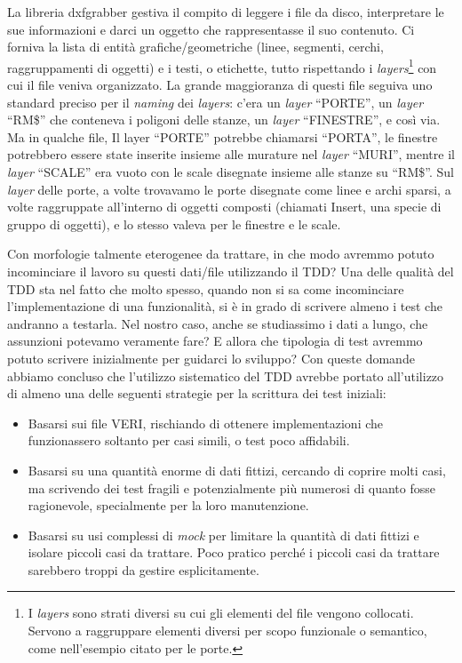 \documentclass[12pt]{report}
\begin{document}
La libreria dxfgrabber gestiva il compito di leggere i file da disco, interpretare le sue informazioni e darci un oggetto che rappresentasse il suo contenuto. Ci forniva la lista di entità grafiche/geometriche (linee, segmenti, cerchi, raggruppamenti di oggetti) e i testi, o etichette, tutto rispettando i 
\textit{layers}\footnote{I \textit{layers} sono strati diversi su cui gli elementi del file vengono collocati. Servono a raggruppare elementi diversi per scopo funzionale o semantico, come nell'esempio citato per le porte.}
con cui il file veniva organizzato. La grande maggioranza di questi file seguiva uno standard preciso per il \textit{naming} dei \textit{layers}: c'era un \textit{layer} ``PORTE'', un \textit{layer} ``RM\$'' che conteneva i poligoni delle stanze, un \textit{layer} ``FINESTRE'', e così via. Ma in qualche file, Il layer ``PORTE'' potrebbe chiamarsi ``PORTA'', le finestre potrebbero essere state inserite insieme alle murature nel \textit{layer} ``MURI'', mentre il \textit{layer} ``SCALE'' era vuoto con le scale disegnate insieme alle stanze su ``RM\$''. Sul \textit{layer} delle porte, a volte trovavamo le porte disegnate come linee e archi sparsi, a volte raggruppate all'interno di oggetti composti (chiamati Insert, una specie di gruppo di oggetti), e lo stesso valeva per le finestre e le scale. 

Con morfologie talmente eterogenee da trattare, in che modo avremmo potuto incominciare il lavoro su questi dati/file utilizzando il TDD? Una delle qualità del TDD sta nel fatto che molto spesso, quando non si sa come incominciare l'implementazione di una funzionalità, si è in grado di scrivere almeno i test che andranno a testarla. Nel nostro caso, anche se studiassimo i dati a lungo, che assunzioni potevamo veramente fare? E allora che tipologia di test avremmo potuto scrivere inizialmente per guidarci lo sviluppo? Con queste domande abbiamo concluso che l'utilizzo sistematico del TDD avrebbe portato all'utilizzo di almeno una delle seguenti strategie per la scrittura dei test iniziali:

\begin{itemize}
  \item Basarsi sui file VERI, rischiando di ottenere implementazioni che funzionassero soltanto per casi simili, o test poco affidabili.
  \item Basarsi su una quantità enorme di dati fittizi, cercando di coprire molti casi, ma scrivendo dei test fragili e potenzialmente più numerosi di quanto fosse ragionevole, specialmente per la loro manutenzione.
  \item Basarsi su usi complessi di \textit{mock} per limitare la quantità di dati fittizi e isolare piccoli casi da trattare. Poco pratico perché i piccoli casi da trattare sarebbero troppi da gestire esplicitamente.
\end{itemize}
\end{document}
